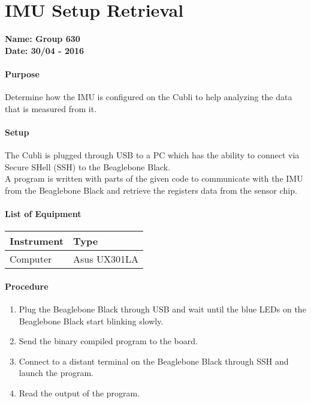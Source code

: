 \chapter{IMU Setup Retrieval} \label{app:IMUSetupRetrieval}
\textbf{Name: Group 630}\\
\textbf{Date: 30/04 - 2016}

\subsubsection{Purpose}
Determine how the IMU is configured on the Cubli to help analyzing the data that is measured from it.

\subsubsection{Setup}
The Cubli is plugged through USB to a PC which has the ability to connect via Secure SHell (SSH) to the Beaglebone Black.\\
A program is written with parts of the given code to communicate with the IMU from the Beaglebone Black and retrieve the registers data from the sensor chip.
                                                     
\subsubsection{List of Equipment}
\begin{table}[H]
\begin{tabular}{|p{10cm}|p{4cm}|}
\hline%
  \textbf{Instrument}                &  \textbf{Type} \\
\hline%
  Computer                           &  Asus UX301LA  \\
\hline%
\end{tabular}
\end{table}

\subsubsection{Procedure}

\begin{enumerate}
  \item Plug the Beaglebone Black through USB and wait until the blue LEDs on the Beaglebone Black start blinking slowly.
  \item Send the binary compiled program to the board.
  \item Connect to a distant terminal on the Beaglebone Black through SSH and launch the program.
  \item Read the output of the program.
\end{enumerate}
